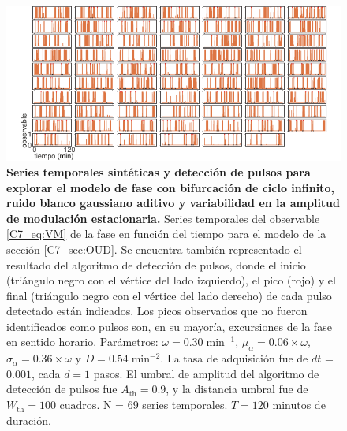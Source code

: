 \documentclass[./main.tex]{subfiles}
\begin{document}
\begin{subappendices}
\begin{figure}
    \centering
    \includegraphics[width=1\columnwidth]{figures/chapter7/C7_dist_traces_for_evaluation_VM.pdf} 
    \caption{\textbf{Series temporales sintéticas y detección de pulsos para explorar el modelo de fase con bifurcación de ciclo infinito, ruido blanco gaussiano aditivo y variabilidad en la amplitud de modulación estacionaria.} Series temporales del observable \ref{C7_eq:VM} de la fase en función del tiempo para el modelo de la sección \ref{C7_sec:OUD}. Se encuentra también representado el resultado del algoritmo de detección de pulsos, donde el inicio (triángulo negro con el vértice del lado izquierdo), el pico (rojo) y el final (triángulo negro con el vértice del lado derecho) de cada pulso detectado están indicados. Los picos observados que no fueron identificados como pulsos son, en su mayoría, excursiones de la fase en sentido horario. Parámetros: $\omega = 0.30 \; \text{min}^{-1}$, $\mu_{\alpha} = 0.06 \times \omega$, $ \sigma_{\alpha} = 0.36  \times \omega$ y $D = 0.54 \; \text{min}^{-2}$. La tasa de adquisición fue de $dt$ = $0.001$, cada $d = 1$ pasos. El umbral de amplitud del algoritmo de detección de pulsos fue $A_{\text{th}} = 0.9$, y la distancia umbral fue de $W_{\text{th}} = 100\text{ cuadros}$. N = $69$ series temporales. $T = 120$ minutos de duración.}
    \label{C7_fig:dist_traces_VM}
\end{figure}
\end{subappendices}
\end{document}
